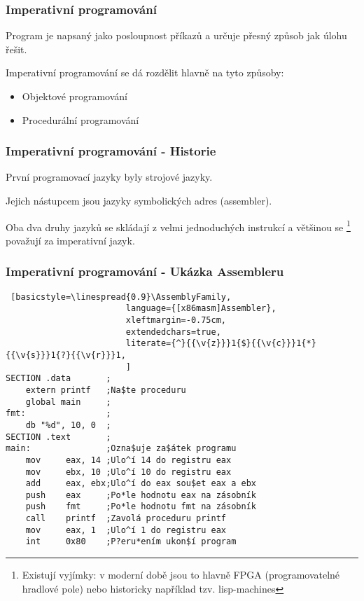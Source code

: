 \begin{frame}
    \frametitle{Imperativní programování}
    Program je napsaný jako posloupnost příkazů a určuje přesný způsob jak úlohu řešit. %

    Imperativní programování se dá rozdělit hlavně na tyto způsoby: 
    \begin{itemize}
        \item Objektové programování
        \item Procedurální programování
    \end{itemize}

    
\end{frame}

\begin{frame}[fragile]
    \frametitle{Imperativní programování - Historie}
    První programovací jazyky byly strojové jazyky. 

    Jejich nástupcem jsou jazyky symbolických adres (assembler). %
    
    Oba dva druhy jazyků se skládají z velmi jednoduchých instrukcí a většinou se
    \footnote{Existují vyjímky: v moderní době jsou to hlavně FPGA (programovatelné hradlové pole) nebo historicky například tzv. lisp-machines} považují za imperativní jazyk.
\end{frame}

\begin{frame}[fragile]
    \frametitle{Imperativní programování - Ukázka Assembleru}

    \newfontfamily{}
    \begin{lstlisting} [basicstyle=\linespread{0.9}\AssemblyFamily,
                        language={[x86masm]Assembler},
                        xleftmargin=-0.75cm,
                        extendedchars=true,
                        literate={^}{{\v{z}}}1{$}{{\v{c}}}1{*}{{\v{s}}}1{?}{{\v{r}}}1,
                        ]
SECTION .data       ;
    extern printf   ;Na$te proceduru
    global main     ;
fmt:                ;
    db "%d", 10, 0  ;
SECTION .text       ;
main:               ;Ozna$uje za$átek programu
    mov     eax, 14 ;Ulo^í 14 do registru eax
    mov     ebx, 10 ;Ulo^í 10 do registru eax
    add     eax, ebx;Ulo^í do eax sou$et eax a ebx 
    push    eax     ;Po*le hodnotu eax na zásobník
    push    fmt     ;Po*le hodnotu fmt na zásobník
    call    printf  ;Zavolá proceduru printf
    mov     eax, 1  ;Ulo^í 1 do registru eax
    int     0x80    ;P?eru*ením ukon$í program
    \end{lstlisting}
\end{frame}


